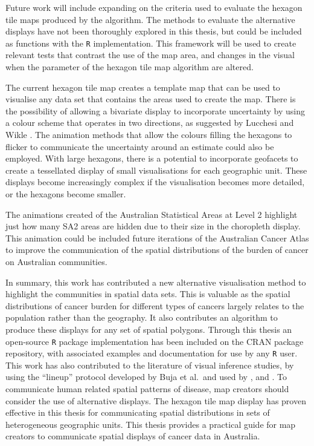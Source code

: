 \documentclass{monashthesis}
\begin{document}
Future work will include expanding on the criteria used to evaluate the hexagon tile maps produced by the algorithm. The methods to evaluate the alternative displays have not been thoroughly explored in this thesis, but could be included as functions with the \texttt{R} implementation. This framework will be used to create relevant tests that contrast the use of the map area, and changes in the visual when the parameter of the hexagon tile map algorithm are altered.

The current hexagon tile map creates a template map that can be used to visualise any data set that contains the areas used to create the map. There is the possibility of allowing a bivariate display to incorporate uncertainty by using a colour scheme that operates in two directions, as suggested by Lucchesi and Wikle \autocite{VUADBC}.
The animation methods that allow the colours filling the hexagons to flicker to communicate the uncertainty around an estimate could also be employed. With large hexagons, there is a potential to incorporate geofacets \autocite{IGF} to create a tessellated display of small visualisations for each geographic unit. These displays become increasingly complex if the visualisation becomes more detailed, or the hexagons become smaller.

The animations created of the Australian Statistical Areas at Level 2 highlight just how many SA2 areas are hidden due to their size in the choropleth display. This animation could be included future iterations of the Australian Cancer Atlas to improve the communication of the spatial distributions of the burden of cancer on Australian communities.

In summary, this work has contributed a new alternative visualisation method to highlight the communities in spatial data sets. This is valuable as the spatial distributions of cancer burden for different types of cancers largely relates to the population rather than the geography. It also contributes an algorithm to produce these displays for any set of spatial polygons. Through this thesis an open-source \texttt{R} package implementation has been included on the CRAN package repository, with associated examples and documentation for use by any \texttt{R} user.
This work has also contributed to the literature of visual inference studies, by using the ``lineup'' protocol developed by Buja et al.~and used by \textcite{GIIV}, and \textcite{GTPCCD}.
To communicate human related spatial patterns of disease, map creators should consider the use of alternative displays. The hexagon tile map display has proven effective in this thesis for communicating spatial distributions in sets of heterogeneous geographic units. This thesis provides a practical guide for map creators to communicate spatial displays of cancer data in Australia.
\end{document}
